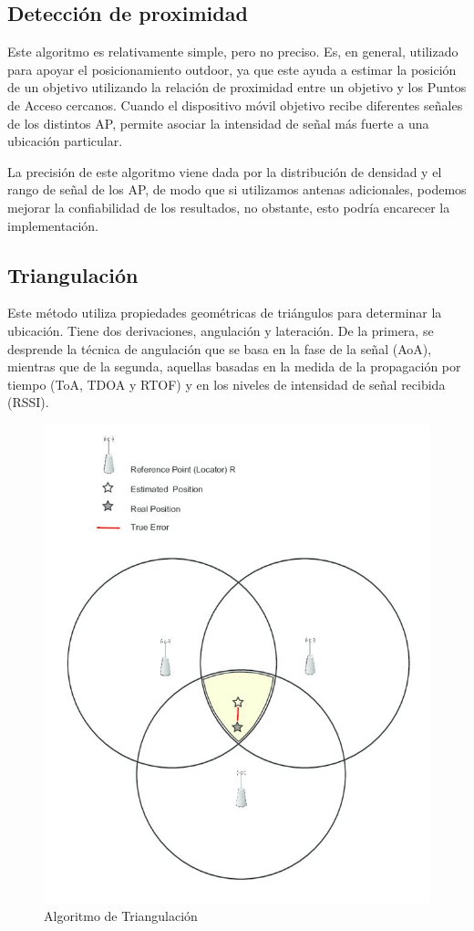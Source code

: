 \subsection{Detección de proximidad}\label{Detección de Proximidad}
Este algoritmo es relativamente simple, pero no preciso. Es, en general, utilizado para apoyar el posicionamiento outdoor, ya que este ayuda a estimar la posición de un objetivo utilizando la relación de proximidad entre un objetivo y los Puntos de Acceso cercanos. Cuando el dispositivo móvil objetivo recibe diferentes señales de los distintos AP, permite asociar la intensidad de señal más fuerte a una ubicación particular. 

La precisión de este algoritmo viene dada por la distribución de densidad y el rango de señal de los AP, de modo que si utilizamos antenas adicionales, podemos mejorar la confiabilidad de los resultados, no obstante, esto podría encarecer la implementación.

\subsection{Triangulación}
Este método utiliza propiedades geométricas de triángulos para determinar la ubicación. Tiene dos derivaciones, angulación y lateración. De la primera, se desprende la  técnica de angulación que se basa en la fase de la señal (AoA), mientras que de la segunda, aquellas basadas en la medida de la propagación por tiempo (ToA, TDOA y RTOF) y en los niveles de intensidad de señal recibida (RSSI). 


\begin{figure}[h!]
    \centering
    \includegraphics[scale=1]{./images/trilat}
    \caption{Algoritmo de Triangulación}
    \label{fig:Triangulación}
\end{figure}

